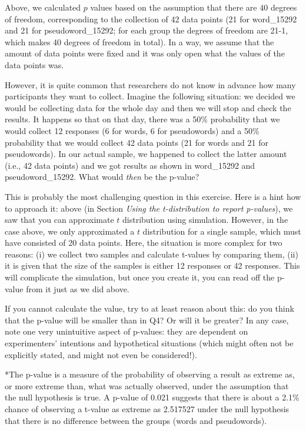\documentclass[
]{article}
\begin{document}
Above, we calculated \(p\) values based on the assumption that there are
40 degrees of freedom, corresponding to the collection of 42 data points
(21 for word\_15292 and 21 for pseudoword\_15292; for each group the
degrees of freedom are 21-1, which makes 40 degrees of freedom in
total). In a way, we assume that the amount of data points were fixed
and it was only open what the values of the data points was.

However, it is quite common that researchers do not know in advance how
many participants they want to collect. Imagine the following situation:
we decided we would be collecting data for the whole day and then we
will stop and check the results. It happens so that on that day, there
was a 50\% probability that we would collect 12 responses (6 for words,
6 for pseudowords) and a 50\% probability that we would collect 42 data
points (21 for words and 21 for pseudowords). In our actual sample, we
happened to collect the latter amount (i.e., 42 data points) and we got
results as shown in word\_15292 and pseudoword\_15292. What would
\emph{then} be the p-value?

This is probably the most challenging question in this exercise. Here is
a hint how to approach it: above (in Section \emph{Using the
t-distribution to report p-values}), we saw that you can approximate
\(t\) distribution using simulation. However, in the case above, we only
approximated a \(t\) distribution for a single sample, which must have
consisted of 20 data points. Here, the situation is more complex for two
reasons: (i) we collect two samples and calculate t-values by comparing
them, (ii) it is given that the size of the samples is either 12
responses or 42 responses. This will complicate the simulation, but once
you create it, you can read off the p-value from it just as we did
above.

If you cannot calculate the value, try to at least reason about this: do
you think that the p-value will be smaller than in Q4? Or will it be
greater? In any case, note one very unintuitive aspect of p-values: they
are dependent on experimenters' intentions and hypothetical situations
(which might often not be explicitly stated, and might not even be
considered!).

*The p-value is a measure of the probability of observing a result as
extreme as, or more extreme than, what was actually observed, under the
assumption that the null hypothesis is true. A p-value of 0.021 suggests
that there is about a 2.1\% chance of observing a t-value as extreme as
2.517527 under the null hypothesis that there is no difference between
the groups (words and pseudowords).
\end{document}
